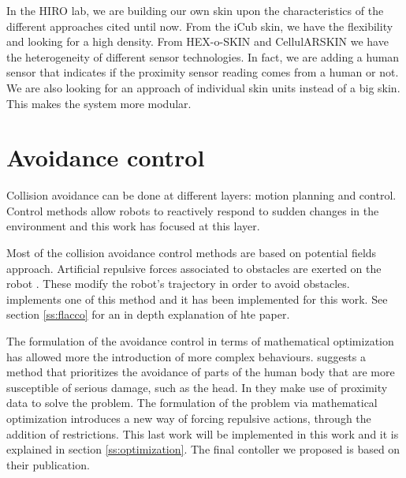 In the HIRO lab, we are building our own skin upon the characteristics of the different approaches cited until now. From the iCub skin, we have the flexibility and looking for a high density. From  HEX-o-SKIN and CellulARSKIN we have the heterogeneity of different sensor technologies. In fact, we are adding a human sensor that indicates if the proximity sensor reading comes from a human or not. We are also looking for an approach of individual skin units instead of a big skin. This makes the system more modular.

\section{Avoidance control}
\label{s:relwork2}

Collision avoidance can be done at different layers: motion planning and control. Control methods allow robots to reactively respond to sudden changes in the environment and this work has focused at this layer.

Most of the collision avoidance control methods are based on potential fields approach. Artificial repulsive forces associated to obstacles are exerted on the robot . These modify the robot's trajectory in order to avoid obstacles. \cite{flacco2012depth} implements one of this method and it has been implemented for this work. See section \ref{ss:flacco} for an in depth explanation of hte paper.

The formulation of the avoidance control in terms of mathematical optimization has allowed more the introduction of more complex behaviours. \cite{nguyen2018compact} suggests a method that prioritizes the avoidance of parts of the human body that are more susceptible of serious damage, such as the head. In \cite{dingcollision} they make use of proximity data to solve the problem. The formulation of the problem via mathematical optimization  introduces a new way of forcing repulsive actions, through the addition of restrictions. This last work will be implemented in this work and it is explained in section \ref{ss:optimization}. The final contoller we proposed is based on their publication.
